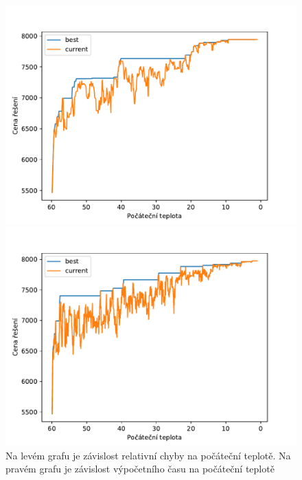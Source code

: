\documentclass[11pt]{article}
\begin{document}
\begin{figure}
\begin{minipage}[c]{0.48\textwidth}
    \end{minipage}
    \\
    \begin{minipage}[c]{0.49\textwidth}
        \centering \includegraphics[width=\textwidth]{img/997.pdf} 
    \end{minipage}
    \begin{minipage}[c]{0.49\textwidth}
        \centering \includegraphics[width=\textwidth]{img/999.pdf} 
    \end{minipage}
   \caption{Na levém grafu je závislost relativní chyby na počáteční teplotě. Na pravém grafu je závislost výpočetního času na počáteční teplotě}\label{fig:GVI}
\end{figure} 
\end{document}
